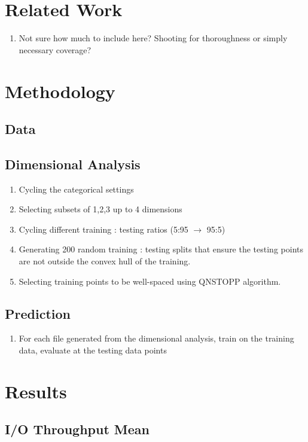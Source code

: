 \documentclass{scspaperproc}
\theoremstyle{scsthe}
\begin{document}
\section{Related Work}
\begin{enumerate}
\item Not sure how much to include here? Shooting for thoroughness or
  simply necessary coverage?
\end{enumerate}


\section{Methodology}
\subsection{Data}
\subsection{Dimensional Analysis}
\begin{enumerate}
\item Cycling the categorical settings
\item Selecting subsets of 1,2,3 up to 4 dimensions
\item Cycling different training : testing ratios (5:95 $\rightarrow$ 95:5)
\item Generating 200 random training : testing splits that ensure the
  testing points are not outside the convex hull of the training.
\item Selecting training points to be well-spaced using QNSTOPP algorithm.
\end{enumerate}

\subsection{Prediction}
\begin{enumerate}
\item For each file generated from the dimensional analysis, train on
  the training data, evaluate at the testing data points
\end{enumerate}


\section{Results}
\subsection{I/O Throughput Mean}
\end{document}
